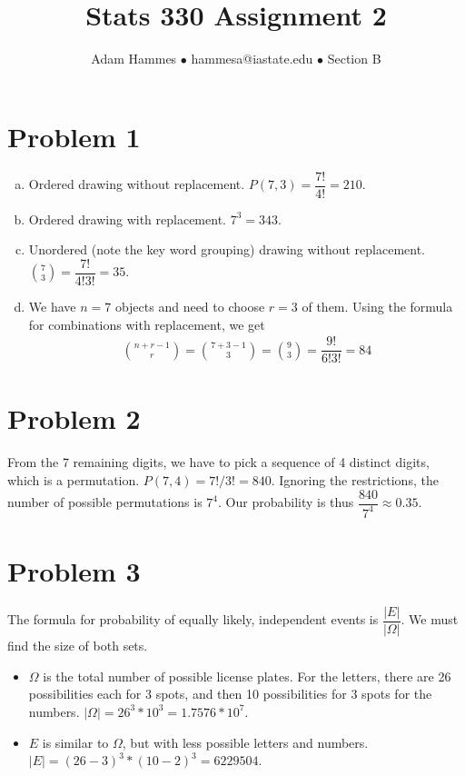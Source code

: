 \documentclass[11pt]{article}
\begin{document}
\title{Stats 330 Assignment 2}
\author{Adam Hammes $\bullet$ hammesa@iastate.edu $\bullet$ Section B}
\maketitle

\section*{Problem 1}
	\begin{enumerate}[(a)]
		\item Ordered drawing without replacement. $P( 7, 3) = \dfrac{7!}{4!} = 
		210$.
		
		\item Ordered drawing with replacement. $7^3 = 343$.
		
		\item Unordered (note the key word grouping) drawing without replacement. $\binom{7}{3} = \dfrac{7!}{4!3!} = 35$.
		
		\item We have $n= 7$ objects and need to choose $r=3$ of them. Using the formula for combinations with replacement, we get
		\begin{align*}
		\binom{n+r-1}{r} = \binom{7+3-1}{3} = \binom{9}{3} =\dfrac{9!}{6!3!} = 84 
		\end{align*}
		
	
	\end{enumerate}
	
\section*{Problem 2}

From the 7 remaining digits, we have to pick a sequence of 4 distinct digits, which is a permutation. $P(7, 4) = 7!/3! = 840$. Ignoring the restrictions, the number of possible permutations is $7^4$. Our probability is thus $\dfrac{840}{7^4} \approx 0.35$.

\section*{Problem 3}

The formula for probability of equally likely, independent events is $\dfrac{|E|}{|\Omega|}$. We must find the size of both sets.
\begin{itemize}
	\item $\Omega$ is the total number of possible license plates. For the letters, there are 26 possibilities each for 3 spots, and then 10 possibilities for 3 spots for the numbers. $|\Omega| = 26^3 * 10^ 3 = 1.7576 * 10^7$.
	
	\item $E$ is similar to $\Omega$, but with less possible letters and numbers. $|E| = (26-3)^3 * (10-2)^3 = 6229504$.
\end{itemize}	
\end{document}
